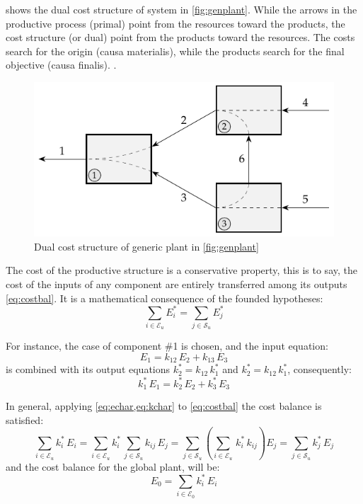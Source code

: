 \documentclass[energies,article,submit,moreauthors,pdftex]{Definitions/mdpi}
\begin{document}
 shows the dual cost structure of system in \cref{fig:genplant}. While the arrows in the productive process (primal) point from the resources toward the products, the cost structure (or dual) point from the products toward the resources. The costs search for the origin (causa materialis), while the products search for the final objective (causa finalis). \cite{Valero1990d}.

\begin{figure}[ht]
    \centering
    \includegraphics{genplantr}
    \caption{Dual cost structure of generic plant in \cref{fig:genplant}}
    \label{fig:genplantr}
\end{figure}

The cost of the productive structure is a conservative property, this is to say, the cost of the inputs of any component are entirely transferred among its outputs \cref{eq:costbal}. It is a mathematical consequence of the founded hypotheses:
\begin{equation}
    \sum_{i\in\mathcal{E}_u}{E_i^*}=\sum_{j\in\mathcal{S}_u}{E_j^*}
    \label{eq:costbal}
\end{equation}

For instance, the case of component \#1 is chosen, and the input equation:
\[
E_1=k_{12}\,E_2+k_{13}\,E_3
\] 
is combined with its output equations $k_2^*=k_{12}\,k_1^*$ and $k_2^*=k_{12}\,k_1^*$, consequently: 
\[
 k_1^*\,E_1 = k_2^*\,E_2+k_3^*\,E_3
\]

In general, applying \cref{eq:echar,eq:kchar} to \cref{eq:costbal} the cost balance is satisfied:
\begin{equation}
    \sum_{i\in\mathcal{E}_u}{k_i^*\,E_i}=\sum_{i\in\mathcal{E}_u}{k_i^*\,\sum_{j\in\mathcal{S}_u}{k_{ij}\,E_j}}=\sum_{j\in\mathcal{S}_u}{\left(\sum_{i\in\mathcal{E}_u}\,k_i^*\,k_{ij}\right)E_j}=\sum_{j\in\mathcal{S}_u}{k_j^*\,E_j}
\end{equation}
and the cost balance for the global plant, will be:
\begin{equation}
    E_0=\sum_{i\in\mathcal{E}_0}{k_i^*\,E_i}
\end{equation}
\end{document}
